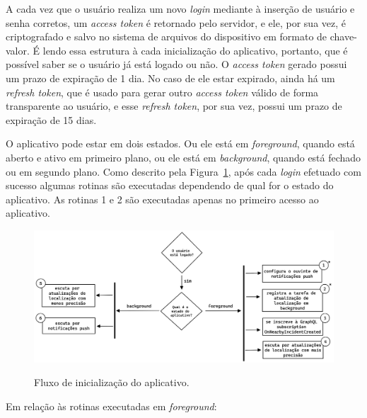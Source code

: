 A cada vez que o usuário realiza um novo \emph{login} mediante à inserção de usuário e senha corretos, um \emph{access token} é retornado pelo servidor, e ele, por sua vez, é criptografado e salvo no sistema de arquivos do dispositivo em formato de chave-valor. É lendo essa estrutura à cada inicialização do aplicativo, portanto, que é possível saber se o usuário já está logado ou não. O \emph{access token} gerado possui um prazo de expiração de 1 dia. No caso de ele estar expirado, ainda há um \emph{refresh token}, que é usado para gerar outro \emph{access token} válido de forma transparente ao usuário, e esse \emph{refresh token}, por sua vez, possui um prazo de expiração de 15 dias.

O aplicativo pode estar em dois estados. Ou ele está em \emph{foreground}, quando está aberto e ativo em primeiro plano, ou ele está em \emph{background}, quando está fechado ou em segundo plano. Como descrito pela Figura~\ref{f.system_app_initialization-flow}, após cada \emph{login} efetuado com sucesso algumas rotinas são executadas dependendo de qual for o estado do aplicativo. As rotinas 1 e 2 são executadas apenas no primeiro acesso ao aplicativo.

\begin{figure}[htbp]
	\caption{\small Fluxo de inicialização do aplicativo.}
	\centering
	\includegraphics[width=\textwidth]{../diagrams/out/system_app_initialization-flow.png}
	\label{f.system_app_initialization-flow}
\end{figure}

\FloatBarrier

Em relação às rotinas executadas em \emph{foreground}:

